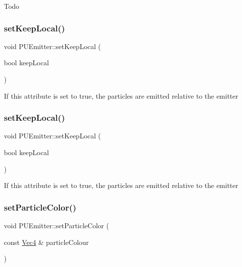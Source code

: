 Todo \mbox{\label{classPUEmitter_ad53330b258cf796c7e0000089cb1a6fa}} 
\subsubsection{\texorpdfstring{set\+Keep\+Local()}{setKeepLocal()}\hspace{0.1cm}{\footnotesize\ttfamily [1/2]}}
{\footnotesize\ttfamily void P\+U\+Emitter\+::set\+Keep\+Local (\begin{DoxyParamCaption}\item[{bool}]{keep\+Local }\end{DoxyParamCaption})}

If this attribute is set to \textquotesingle{}true\textquotesingle{}, the particles are emitted relative to the emitter \mbox{\label{classPUEmitter_ad53330b258cf796c7e0000089cb1a6fa}} 
\subsubsection{\texorpdfstring{set\+Keep\+Local()}{setKeepLocal()}\hspace{0.1cm}{\footnotesize\ttfamily [2/2]}}
{\footnotesize\ttfamily void P\+U\+Emitter\+::set\+Keep\+Local (\begin{DoxyParamCaption}\item[{bool}]{keep\+Local }\end{DoxyParamCaption})}

If this attribute is set to \textquotesingle{}true\textquotesingle{}, the particles are emitted relative to the emitter \mbox{\label{classPUEmitter_a0d0e51b19fd247625f86ed120dc0fe94}} 
\subsubsection{\texorpdfstring{set\+Particle\+Color()}{setParticleColor()}\hspace{0.1cm}{\footnotesize\ttfamily [1/2]}}
{\footnotesize\ttfamily void P\+U\+Emitter\+::set\+Particle\+Color (\begin{DoxyParamCaption}\item[{const \hyperlink{classVec4}{Vec4} \&}]{particle\+Colour }\end{DoxyParamCaption})}

